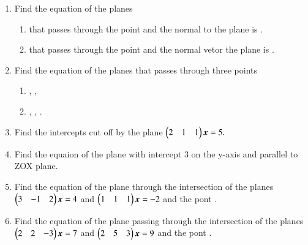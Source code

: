 \begin{enumerate}[label=\arabic*.,ref=\thesubsection.\theenumi]
\begin{enumerate}[itemsep=2pt]
\end{enumerate}
\item Find the equation of the planes
\begin{enumerate}
\item that passes through the point  and the normal to the plane is .
\item that passes through the point  and the normal vetor the plane is .
\end{enumerate}
\item Find the equation of the planes that passes through three points
\begin{enumerate}
\item {}, , 
\item {}, , .
\end{enumerate}
\item Find the intercepts cut off by the plane 
$
\begin{pmatrix}2 & 1 & 1\end{pmatrix}\bm{x}=5.
$
\item Find the equaion of the plane with intercept 3 on the y-axis and parallel to ZOX plane.
\item Find the equation of the plane through the intersection of the planes 
$
\begin{pmatrix}3 & -1 & 2\end{pmatrix}\bm{x}=4
$
 and 
$
\begin{pmatrix}1 & 1 & 1\end{pmatrix}\bm{x}=-2
$
and the pont .
%
\item Find the equation of the plane passing through the intersection of the planes 
$
\begin{pmatrix}2 & 2 & -3\end{pmatrix}\bm{x}=7
$
 and 
$
\begin{pmatrix}2 & 5 & 3\end{pmatrix}\bm{x}=9
$
and the pont .

\end{enumerate}
